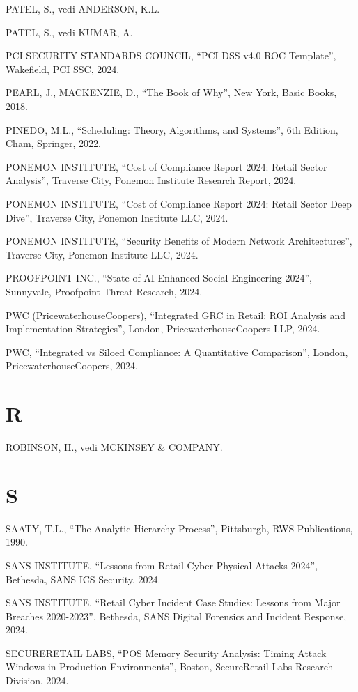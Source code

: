 \documentclass[12pt,a4paper,oneside]{book}
\numberwithin{figure}{chapter} %
\numberwithin{table}{chapter}  %
\begin{document}
PATEL, S., vedi ANDERSON, K.L.

PATEL, S., vedi KUMAR, A.

PCI SECURITY STANDARDS COUNCIL, ``PCI DSS v4.0 ROC Template'',
Wakefield, PCI SSC, 2024.

PEARL, J., MACKENZIE, D., ``The Book of Why'', New York, Basic Books,
2018.

PINEDO, M.L., ``Scheduling: Theory, Algorithms, and Systems'', 6th
Edition, Cham, Springer, 2022.

PONEMON INSTITUTE, ``Cost of Compliance Report 2024: Retail Sector
Analysis'', Traverse City, Ponemon Institute Research Report, 2024.

PONEMON INSTITUTE, ``Cost of Compliance Report 2024: Retail Sector Deep
Dive'', Traverse City, Ponemon Institute LLC, 2024.

PONEMON INSTITUTE, ``Security Benefits of Modern Network
Architectures'', Traverse City, Ponemon Institute LLC, 2024.

PROOFPOINT INC., ``State of AI-Enhanced Social Engineering 2024'',
Sunnyvale, Proofpoint Threat Research, 2024.

PWC (PricewaterhouseCoopers), ``Integrated GRC in Retail: ROI Analysis
and Implementation Strategies'', London, PricewaterhouseCoopers LLP,
2024.

PWC, ``Integrated vs Siloed Compliance: A Quantitative Comparison'',
London, PricewaterhouseCoopers, 2024.

\section{R}\label{r-1}

ROBINSON, H., vedi MCKINSEY \& COMPANY.

\section{S}\label{s-1}

SAATY, T.L., ``The Analytic Hierarchy Process'', Pittsburgh, RWS
Publications, 1990.

SANS INSTITUTE, ``Lessons from Retail Cyber-Physical Attacks 2024'',
Bethesda, SANS ICS Security, 2024.

SANS INSTITUTE, ``Retail Cyber Incident Case Studies: Lessons from Major
Breaches 2020-2023'', Bethesda, SANS Digital Forensics and Incident
Response, 2024.

SECURERETAIL LABS, ``POS Memory Security Analysis: Timing Attack Windows
in Production Environments'', Boston, SecureRetail Labs Research
Division, 2024.
\end{document}
